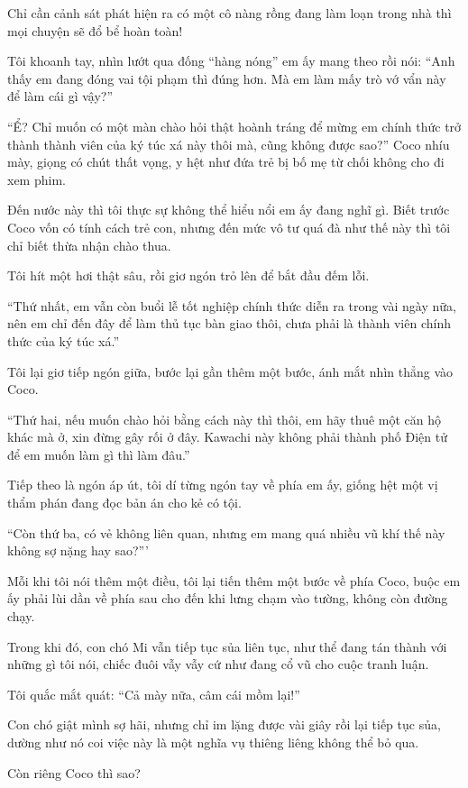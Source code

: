 \documentclass[../main.tex]{subfiles}
\begin{document}
Chỉ cần cảnh sát phát hiện ra có một cô nàng rồng đang làm loạn trong nhà thì mọi chuyện sẽ đổ bể hoàn toàn!

Tôi khoanh tay, nhìn lướt qua đống ``hàng nóng'' em ấy mang theo rồi nói: ``Anh thấy em đang đóng vai tội phạm thì đúng hơn. Mà em làm mấy trò vớ vẩn này để làm cái gì vậy?''

``Ể? Chỉ muốn có một màn chào hỏi thật hoành tráng để mừng em chính thức trở thành thành viên của ký túc xá này thôi mà, cũng không được sao?'' Coco nhíu mày, giọng có chút thất vọng, y hệt như đứa trẻ bị bố mẹ từ chối không cho đi xem phim.

Đến nước này thì tôi thực sự không thể hiểu nổi em ấy đang nghĩ gì. Biết trước Coco vốn có tính cách trẻ con, nhưng đến mức vô tư quá đà như thế này thì tôi chỉ biết thừa nhận chào thua.

Tôi hít một hơi thật sâu, rồi giơ ngón trỏ lên để bắt đầu đếm lỗi.

``Thứ nhất, em vẫn còn buổi lễ tốt nghiệp chính thức diễn ra trong vài ngày nữa, nên em chỉ đến đây để làm thủ tục bàn giao thôi, chưa phải là thành viên chính thức của ký túc xá.''

Tôi lại giơ tiếp ngón giữa, bước lại gần thêm một bước, ánh mắt nhìn thẳng vào Coco.

``Thứ hai, nếu muốn chào hỏi bằng cách này thì thôi, em hãy thuê một căn hộ khác mà ở, xin đừng gây rối ở đây. Kawachi này không phải thành phố Điện tử để em muốn làm gì thì làm đâu.''

Tiếp theo là ngón áp út, tôi dí từng ngón tay về phía em ấy, giống hệt một vị thẩm phán đang đọc bản án cho kẻ có tội.

``Còn thứ ba, có vẻ không liên quan, nhưng em mang quá nhiều vũ khí thế này không sợ nặng hay sao?'''

Mỗi khi tôi nói thêm một điều, tôi lại tiến thêm một bước về phía Coco, buộc em ấy phải lùi dần về phía sau cho đến khi lưng chạm vào tường, không còn đường chạy.

Trong khi đó, con chó Mi vẫn tiếp tục sủa liên tục, như thể đang tán thành với những gì tôi nói, chiếc đuôi vẫy vẫy cứ như đang cổ vũ cho cuộc tranh luận.

Tôi quắc mắt quát: ``Cả mày nữa, câm cái mồm lại!''

Con chó giật mình sợ hãi, nhưng chỉ im lặng được vài giây rồi lại tiếp tục sủa, dường như nó coi việc này là một nghĩa vụ thiêng liêng không thể bỏ qua.

Còn riêng Coco thì sao?
\end{document}
